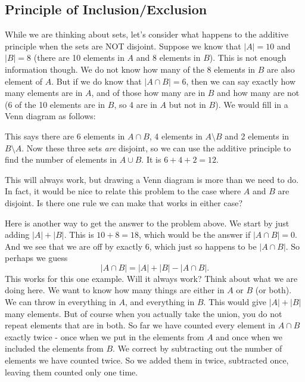 \documentclass[12pt]{article}
\begin{document}
\subsection{Principle of Inclusion/Exclusion}

While we are thinking about sets, let's consider what happens to the additive principle when the sets are NOT disjoint. Suppose we know that $|A| = 10$ and $|B| = 8$ (there are 10 elements in $A$ and 8 elements in $B$).  This is not enough information though.  We do not know how many of the 8 elements in $B$ are also element of $A$.  But if we do know that $|A \cap B| = 6$, then we can say exactly how many elements are in $A$, and of those how many are in $B$ and how many are not (6 of the 10 elements are in $B$, so 4 are in $A$ but not in $B$).  We would fill in a Venn diagram as follows:

\begin{center}



\end{center}

This says there are 6 elements in $A \cap B$, 4 elements in $A \setminus B$ and 2 elements in $B \setminus A$.  Now these three sets {\em are} disjoint, so we can use the additive principle to find the number of elements in $A \cup B$.  It is $6 + 4 + 2 = 12$.  

This will always work, but drawing a Venn diagram is more than we need to do.  In fact, it would be nice to relate this problem to the case where $A$ and $B$ are disjoint.  Is there one rule we can make that works in either case?

Here is another way to get the answer to the problem above.  We start by just adding $|A| + |B|$.  This is $10 + 8 = 18$, which would be the answer if $|A \cap B| = 0$.  And we see that we are off by exactly 6, which just so happens to be $|A \cap B|$.  So perhaps we guess
\[|A \cap B| = |A| + |B| - |A \cap B|.\]
This works for this one example.  Will it always work?  Think about what we are doing here.  We want to know how many things are either in $A$ or $B$ (or both).  We can throw in everything in $A$, and everything in $B$.  This would give $|A| + |B|$ many elements.  But of course when you actually take the union, you do not repeat elements that are in both.  So far we have counted every element in $A \cap B$ exactly twice - once when we put in the elements from $A$ and once when we included the elements from $B$.  We correct by subtracting out the number of elements we have counted twice.  So we added them in twice, subtracted once, leaving them counted only one time.
\end{document}
